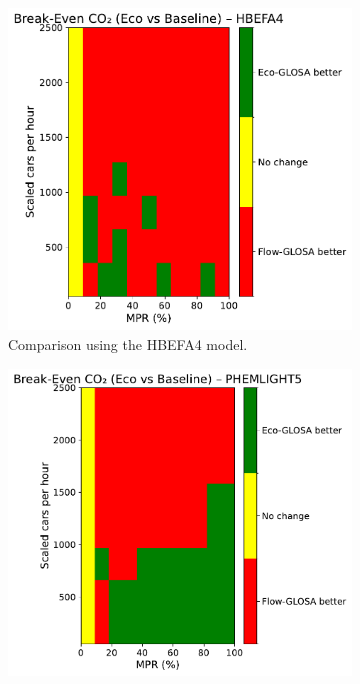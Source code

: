 \begin{figure}[htbp]
  \centering
  \begin{subfigure}[b]{0.65\textwidth}
    \includegraphics[width=\textwidth]{data/img/BreakEven/BreakEven_CO2_HBEFA4.pdf}
    \caption{Comparison using the HBEFA4 model.}
    \label{fig:BE_EcoFlow_HBEFA4}
  \end{subfigure}
  \begin{subfigure}[b]{0.65\textwidth}
    \includegraphics[width=\textwidth]{data/img/BreakEven/BreakEven_CO2_PHEMLIGHT5.pdf}

\end{subfigure}
\end{figure}
